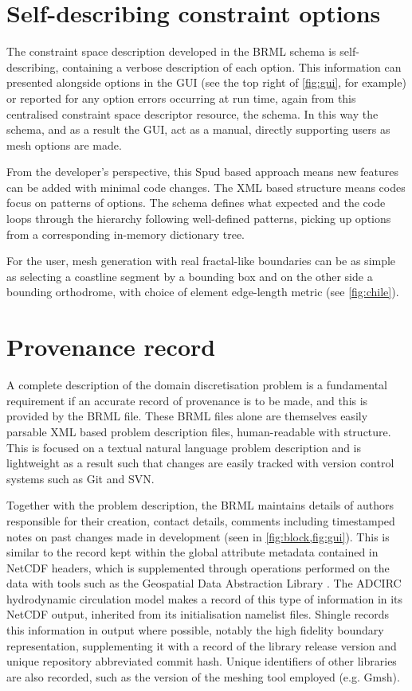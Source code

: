 \documentclass[a4paper, 10pt]{book}
\providecommand{\shingle}{Shingle\xspace}
\providecommand{\brml}{BRML\xspace}
\providecommand{\brep}{boundary representation\xspace}
\begin{document}
\section{Self-describing constraint options}
The constraint space description developed in the \brml schema is self-describing,
containing a verbose description of each option.
%
This information can presented alongside options in the GUI (see the top right of \cref{fig:gui}, for example) or reported for any option errors occurring at run time,
again from this centralised constraint space descriptor resource, the schema.
In this way the schema, and as a result the GUI, act as a manual, directly supporting users as mesh options are made.
%

From the developer's perspective,
this Spud based approach means new features can be added with minimal code changes.
The XML based structure means codes focus on patterns of options.
%
The schema defines what expected and the code loops through the hierarchy following well-defined patterns,
picking up options from a corresponding in-memory dictionary tree.

For the user, mesh generation with real fractal-like boundaries can be as simple as selecting a coastline segment by a bounding box and on the other side a bounding orthodrome, with choice of element edge-length metric (see \cref{fig:chile}).



\section{Provenance record}
%
A complete description of the domain discretisation problem is a fundamental requirement if an accurate record of
provenance is to be made, and this is provided by the \brml file.
%
These \brml files alone are themselves
easily parsable XML based problem description files, human-readable with structure.
%
This is focused on a textual natural language problem description and is lightweight as a result
such that changes are easily tracked with 
version control systems such as Git and SVN.

Together with the problem description,
the \brml maintains 
details of authors responsible for their creation, contact details,
%
comments including timestamped notes on past changes made in development (seen in \cref{fig:block,fig:gui}).
%
This is similar to the record kept within the global attribute metadata contained in NetCDF headers,
%
which is supplemented through operations performed on the data with tools such as
the Geospatial Data Abstraction Library \citep{gdal}.
%
The ADCIRC hydrodynamic circulation model \citep{westerink08} makes a record of this type of information in its NetCDF output,
inherited from its initialisation namelist files.
%
\shingle records this information in output where possible,
notably the high fidelity \brep,
%
supplementing it with a record of 
the library release version and unique
repository abbreviated commit hash.
%
Unique identifiers of other libraries are also recorded,
such as the version of the meshing tool employed (e.g. Gmsh).
\end{document}
